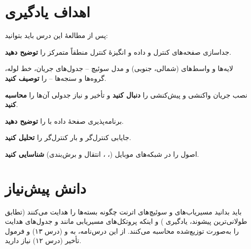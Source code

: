 \documentclass[11pt,a4paper]{article}
\begin{document}
\ACNcover

\section{اهداف یادگیری}
پس از مطالعهٔ این درس باید بتوانید:
\begin{objectives}
  \item جداسازی صفحه‌های کنترل و داده و انگیزهٔ کنترل منطقاً متمرکز را \textbf{توضیح دهید}.
  \item لایه‌ها و واسط‌های  (شمالی، جنوبی) و مدل سوئیچ  -- جدول‌های جریان، خط لوله، گروه‌ها و
        سنجه‌ها -- را \textbf{توصیف کنید}.
  \item نصب جریان واکنشی و پیش‌کنشی را \textbf{دنبال کنید} و تأخیر و نیاز جدولی آن‌ها را \textbf{محاسبه کنید}.
  \item برنامه‌پذیری صفحهٔ داده با  را \textbf{توضیح دهید}.
  \item جایابی کنترل‌گر و بار کنترل‌گر را \textbf{تحلیل کنید}.
  \item اصول  را در شبکه‌های موبایل (، ، انتقال و برش‌بندی) \textbf{شناسایی کنید}.
\end{objectives}

\section{دانش پیش‌نیاز}
باید بدانید مسیریاب‌های  و سوئیچ‌های اترنت چگونه بسته‌ها را هدایت می‌کنند (تطابق طولانی‌ترین پیشوند، یادگیری
) و اینکه پروتکل‌های مسیریابی مانند  و  جدول‌های هدایت را به‌صورت توزیع‌شده محاسبه می‌کنند. از
این درس‌نامه، به  و  (درس ۱۳) و فرمول تأخیر  (درس ۱۲) نیاز دارید.
\end{document}
